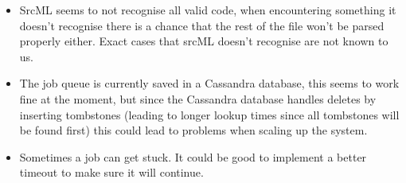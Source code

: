 \documentclass[./Main.tex]{subfiles}
\begin{document}
\begin{itemize}
    \item SrcML seems to not recognise all valid code, when encountering something it doesn't recognise there is a chance that the rest of the file won't be parsed properly either. Exact cases that srcML doesn't recognise are not known to us.
    \item The job queue is currently saved in a Cassandra database, this seems to work fine at the moment, but since the Cassandra database handles deletes by inserting tombstones (leading to longer lookup times since all tombstones will be found first) this could lead to problems when scaling up the system.
    \item Sometimes a job can get stuck. It could be good to implement a better timeout to make sure it will continue.
\end{itemize}
\end{document}
